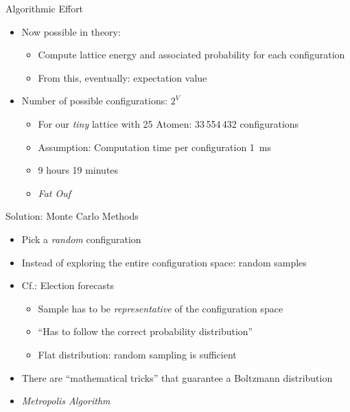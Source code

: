 
\begin{frame}{Algorithmic Effort}
%
\begin{itemize}
\item Now possible in theory:
	\begin{itemize}
	\item Compute lattice energy and associated probability for each configuration
	\item From this, eventually: expectation value
	\end{itemize}
\item Number of possible configurations: $2^V$
	\begin{itemize}
	\item For our \emph{tiny} lattice with 25 Atomen: 33\,554\,432 configurations
	\item Assumption: Computation time per configuration \SI{1}{ms}
	\item[\Thus] 9 hours 19 minutes
	\item[\Thus]  \emph{Fat Ouf}
	\end{itemize}
\end{itemize}
%
\end{frame}


\begin{frame}{Solution: Monte Carlo Methods}
%
\begin{itemize}
\item Pick a \emph{random} configuration
\item[\Thus] Instead of exploring the entire configuration space: random samples
\item Cf.: Election forecasts
	\begin{itemize}
	\item Sample has to be \emph{representative} of the configuration space
	\item \enquote{Has to follow the correct probability distribution}
	\item Flat distribution: random sampling is sufficient
	\end{itemize}
\item There are \enquote{mathematical tricks} that guarantee a Boltzmann distribution
\item[\Thus] \emph{Metropolis Algorithm}
\end{itemize}
%
\end{frame}

